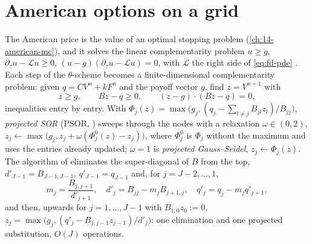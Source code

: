 \section{American options on a grid}\label{sec:fd-american}

The American price is the value of an optimal stopping problem (\cref{ch:14-american-mc}), and
it solves the linear complementarity problem
$u\ge g$, $\partial_\tau u-\mathcal Lu\ge0$, $(u-g)(\partial_\tau u-\mathcal Lu)=0$, with $\mathcal L$ the right side of \eqref{eq:fd-pde}
\citep{jaillet-lamberton-lapeyre-1990}. Each step of the $\theta$-scheme becomes a finite-dimensional
complementarity problem: given $q=CV^n+kF^n$ and the payoff vector $g$, find $z=V^{n+1}$ with
\begin{equation}\label{eq:fd-lcp}
  z\ge g,\qquad Bz-q\ge0,\qquad(z-g)\cdot(Bz-q)=0,
\end{equation}
inequalities entry by entry. With $\Phi_j(z)=\max\big(g_j,(q_j-\sum_{l\ne j}B_{jl}z_l)/B_{jj}\big)$,
\emph{projected SOR} (PSOR, \textcite{cryer-1971}) sweeps through the nodes with a relaxation
$\omega\in(0,2)$, $z_j\leftarrow\max\big(g_j,z_j+\omega(\Phi^0_j(z)-z_j)\big)$, where $\Phi^0_j$ is $\Phi_j$ without the maximum and
uses the entries already updated; $\omega=1$ is \emph{projected Gauss--Seidel},
$z_j\leftarrow\Phi_j(z)$. The algorithm of \textcite{brennan-schwartz-1977} eliminates the
super-diagonal of $B$ from the top, $d'_{J-1}=B_{J-1,J-1}$, $q'_{J-1}=q_{J-1}$ and, for
$j=J-2,\dots,1$,
\begin{equation}\label{eq:fd-bs}
  m_j=\frac{B_{j,j+1}}{d'_{j+1}},\quad d'_j=B_{jj}-m_jB_{j+1,j},\quad q'_j=q_j-m_jq'_{j+1},
\end{equation}
and then, upwards for $j=1,\dots,J-1$ with $B_{1,0}z_0:=0$,
$z_j=\max\big(g_j,(q'_j-B_{j,j-1}z_{j-1})/d'_j\big)$: one elimination and one projected substitution,
$O(J)$ operations.


